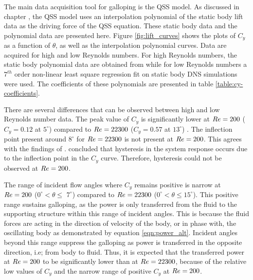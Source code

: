The main data acquisition tool for galloping is the QSS model. As discussed in chapter \label{sec:QSS_model_methodology}, the QSS model uses an interpolation polynomial of the static body lift data as the driving force of the QSS equation. These static body data and the polynomial data are presented here.  Figure \ref{fig:lift_curves} shows the plots of $C_y$ as a function of $\theta$, as well as the interpolation polynomial curves. Data are acquired for high and low Reynolds numbers. For high Reynolds numbers, the static body polynomial data are obtained from \cite{Parkinson1964} while for low Reynolds numbers a $7^{th}$ order non-linear least square regression fit on static body DNS simulations were used. The coefficients of these  polynomials are presented in table \ref{table:cy-coefficients}.






There are several differences that can be observed between high and low Reynolds number data. The peak value of $C_y$ is  significantly lower at $Re=200$ ($C_y=0.12$ at $5^\circ$) compared to $Re=22300$ ($C_y=0.57$ at $13^\circ$) . The inflection point present around $8^\circ$ for $Re=22300$ is not present at $Re=200$. This agrees with the findings of \cite{Luo2003}. \cite{Luo2003} concluded that hysteresis in the system response occurs due to the inflection point in the $C_y$ curve. Therefore, hysteresis could not be observed at $Re=200$.

The range of incident flow angles where $C_y$ remains positive is narrow at $Re=200$ ($0^\circ <\theta \leq$ $7^\circ$) compared to $Re=22300$ ($0^\circ <\theta \leq 15^\circ$). This positive range sustains galloping, as the power is only transferred from the fluid to the supporting structure within this range of incident angles. This is because the fluid forces are acting in the 
direction of velocity of the body, or in phase with, the oscillating body as demonstrated by equation \ref{eqn:power_alt}. Incident angles beyond this range suppress the galloping as power is transferred in the opposite direction, i.e; from body to fluid. Thus, it is expected that the transferred power at $Re=200$ to be significantly lower than at $Re=22300$, because of the relative low values of $C_y$ and the narrow range of positive $C_y$ at $Re=200$.


